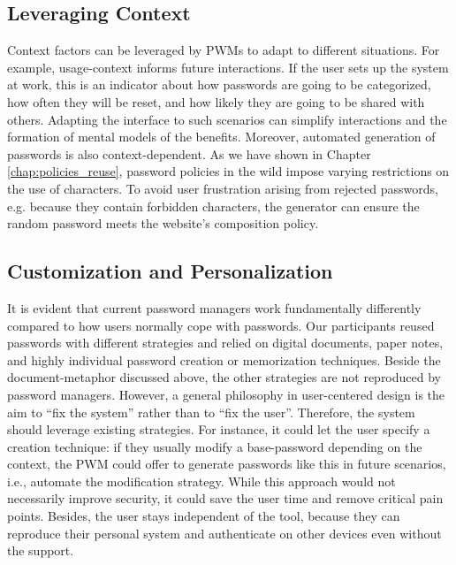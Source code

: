 \subsection{Leveraging Context}
Context factors can be leveraged by PWMs to adapt to different situations. For example, usage-context informs future interactions. If the user sets up the system at work, this is an indicator about how passwords are going to be categorized, how often they will be reset, and how likely they are going to be shared with others. Adapting the interface to such scenarios can simplify interactions and the formation of mental models of the benefits. Moreover, automated generation of passwords is also context-dependent. As we have shown in Chapter \ref{chap:policies_reuse}, password policies in the wild impose varying restrictions on the use of characters. To avoid user frustration arising from rejected passwords, e.g. because they contain forbidden characters, the generator can ensure the random password meets the website's composition policy. 


\subsection{Customization and Personalization}
It is evident that current password managers work fundamentally differently compared to how users normally cope with passwords. Our participants reused passwords with different strategies and relied on digital documents, paper notes, and highly individual password creation or memorization techniques. Beside the document-metaphor discussed above, the other strategies are not reproduced by password managers. However, a general philosophy in user-centered design is the aim to ``fix the system'' rather than to ``fix the user''. Therefore, the system should leverage existing strategies. For instance, it could let the user specify a creation technique: if they usually modify a base-password depending on the context, the PWM could offer to generate passwords like this in future scenarios, i.e., automate the modification strategy. While this approach would not necessarily improve security, it could save the user time and remove critical pain points. Besides, the user stays independent of the tool, because they can reproduce their personal system and authenticate on other devices even without the support. 

